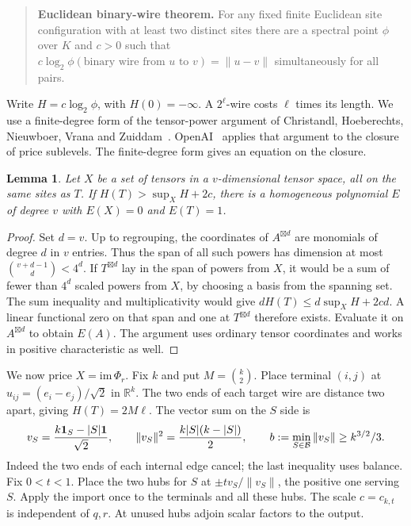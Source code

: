\documentclass[11pt,letterpaper]{article}
\newtheorem{lemma}[theorem]{Lemma}
\newcommand{\bal}{\mathcal B}
\begin{document}
\begin{quote}
\textbf{Euclidean binary-wire theorem.}
For any fixed finite Euclidean site configuration with at least two
distinct sites there are a spectral point $\phi$ over $K$ and $c>0$
such that $c\log_2\phi(\text{binary wire from }u\text{ to }v)=\|u-v\|$
simultaneously for all pairs.
\end{quote}

Write $H=c\log_2\phi$, with $H(0)=-\infty$. A $2^\ell$-wire costs
$\ell$ times its length. We use a finite-degree form of the tensor-power argument of Christandl, Hoeberechts, Nieuwboer, Vrana and Zuiddam~\cite[Lemma~2.3, Theorem~2.2 and Corollary~2.4]{chnvz-polynomials}. OpenAI~\cite[Lemma~2.1]{euclid} applies that argument to the closure of price sublevels. The finite-degree form gives an equation on the closure.

\begin{lemma}\label{equation}
Let $X$ be a set of tensors in a $v$-dimensional tensor space, all on
the same sites as $T$. If $H(T)>\sup_X H+2c$, there is a homogeneous
polynomial $E$ of degree $v$ with $E(X)=0$ and $E(T)=1$.
\end{lemma}
\begin{proof}
Set $d=v$. Up to regrouping, the coordinates of $A^{\boxtimes d}$ are
monomials of degree $d$ in $v$ entries. Thus the span of all such powers
has dimension at most $\binom{v+d-1}{d}<4^d$. If $T^{\boxtimes d}$ lay
in the span of powers from $X$, it would be a sum of fewer than $4^d$
scaled powers from $X$, by choosing a basis from the spanning set.
The sum inequality and multiplicativity would give
$dH(T)\le d\sup_X H+2cd$. A linear functional zero on that span and
one at $T^{\boxtimes d}$ therefore exists. Evaluate it on
$A^{\boxtimes d}$ to obtain $E(A)$. The argument uses ordinary tensor
coordinates and works in positive characteristic as well.
\end{proof}

We now price $X=\mathrm{im}\,\Phi_r$. Fix $k$ and put $M=\binom k2$.
Place terminal $(i,j)$ at $u_{ij}=(e_i-e_j)/\sqrt2$ in $\mathbb R^k$.
The two ends of each target wire are distance two apart, giving
$H(T)=2M\ell$. The vector sum on the $S$ side is
\[
 v_S=\frac{k{\bf1}_S-|S|{\bf1}}{\sqrt2},
 \qquad \|v_S\|^2=\frac{k|S|(k-|S|)}2,\qquad
 b:=\min_{S\in\bal}\|v_S\|\ge k^{3/2}/3 .
\]
Indeed the two ends of each internal edge cancel; the last inequality
uses balance. Fix $0<t<1$. Place the two hubs for $S$ at
$\pm t v_S/\|v_S\|$, the positive one serving $S$. Apply the import
once to the terminals and all these hubs. The scale $c=c_{k,t}$ is
independent of $q,r$. At unused hubs adjoin scalar factors to the output.
\end{document}
